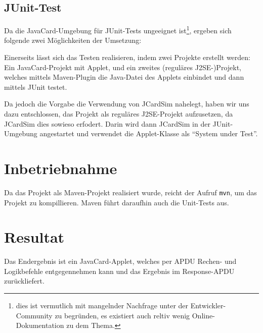 \documentclass[paper=a4, fontsize=11pt]{scrartcl}
\begin{document}
\subsection{JUnit-Test}
Da die JavaCard-Umgebung für JUnit-Tests ungeeignet ist\footnote{dies ist vermutlich mit mangelnder Nachfrage unter der Entwickler-Community zu begründen, es existiert auch reltiv wenig Online-Dokumentation zu dem Thema.}, ergeben sich folgende zwei Möglichkeiten der Umsetzung:

Einerseits lässt sich das Testen realisieren, indem zwei Projekte erstellt werden: Ein JavaCard-Projekt mit Applet, und ein zweites (reguläres J2SE-)Projekt, welches mittels Maven-Plugin die Java-Datei des Applets einbindet und dann mittels JUnit testet.

Da jedoch die Vorgabe die Verwendung von JCardSim nahelegt, haben wir uns dazu entschlossen, das Projekt als reguläres J2SE-Projekt aufzusetzen, da JCardSim dies sowieso erfodert. Darin wird dann JCardSim in der JUnit-Umgebung angestartet und verwendet die Applet-Klasse als \enquote{System under Test}.

\section{Inbetriebnahme}

Da das Projekt als Maven-Projekt realisiert wurde, reicht der Aufruf \texttt{mvn}, um das Projekt zu kompillieren. Maven führt daraufhin auch die Unit-Tests aus.

\section{Resultat}
Das Endergebnis ist ein JavaCard-Applet, welches per APDU Rechen- und Logikbefehle entgegennehmen kann und das Ergebnis im Response-APDU zurückliefert.
\end{document}
